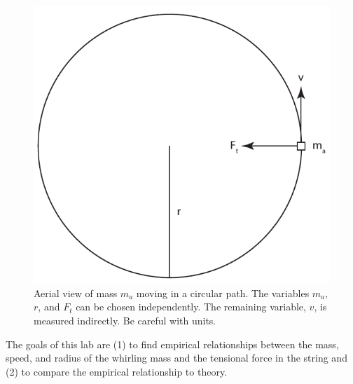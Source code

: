 \documentclass[11pt,letterpaper]{article}
\begin{document}
\begin{figure}[h]
\begin{center}
\includegraphics[scale=0.8]{./orbit}
\end{center}
\caption{Aerial view of mass $m_a$ moving in a circular path. The variables $m_a$, $r$, and $F_t$ can be chosen independently. The remaining variable, $v$, is measured indirectly. Be careful with units.}
\label{fig:whirlingmass2}
\end{figure} 



The goals of this lab are (1) to find empirical relationships between the mass, speed, and radius of the whirling mass and the tensional force in the string and (2) to compare the empirical relationship to theory.

\vspace{1cm}
\end{document}
